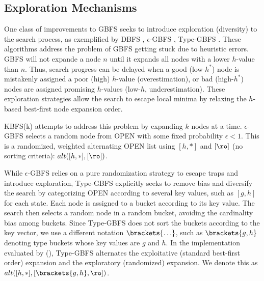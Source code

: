 \subsection{Exploration Mechanisms}

One class of improvements to GBFS seeks to introduce exploration (diversity) to the search process, as exemplified by DBFS \cite{imai2011novel}, $\epsilon$-GBFS \cite{valenzano2014comparison}, Type-GBFS
\cite{xie14type}.
These algorithms address the problem of GBFS getting stuck due to heuristic errors.
GBFS will not expande a node $n$  until it expands all nodes with a lower $h$-value than $n$.
Thus, search progress can be delayed when a good (low-$h^*$) node is mistakenly assigned a poor (high) $h$-value (overestimation), or bad (high-$h^*$) nodes are assigned promising $h$-values (low-$h$, underestimation).
These exploration strategies allow the search to escape local minima by relaxing the $h$-based best-first node expansion order.

KBFS(k) \cite{felner2003kbfs} attempts to address this problem by expanding $k$ nodes at a time.
% 
% 
$\epsilon$-GBFS \cite{valenzano2014comparison} selects a random node from OPEN with some fixed probability $\epsilon <1$.
This is a randomized, weighted alternating 
OPEN list using $[h,*]$ and $[\ro]$ (no sorting criteria): $\mit{alt}([h,*],[\ro])$.

While $\epsilon$-GBFS relies on  a pure randomization strategy to escape traps and introduce exploration, 
Type-GBFS \cite{xie14type} explicitly seeks to remove bias and diversify the search  by categorizing OPEN according to several key values, such as $[g,h]$ for each state.
Each node is assigned to a bucket according to its key value.
The search then selects a random node in a random
bucket, avoiding the cardinality bias among buckets.
Since Type-GBFS does not sort the buckets according to the key vector, we use a different notation $\brackets{\ldots}$,
such as $\brackets{g,h}$ denoting type buckets whose key values are $g$ and $h$.
In the implementation evaluated by \citeauthor{xie14type} (\citeyear{xie14type}),
Type-GBFS alternates the exploitative (standard best-first order) expansion and the exploratory (randomized) expansion. We denote this 
 as $\mit{alt}([h,*], [\brackets{g,h},\ro])$.

